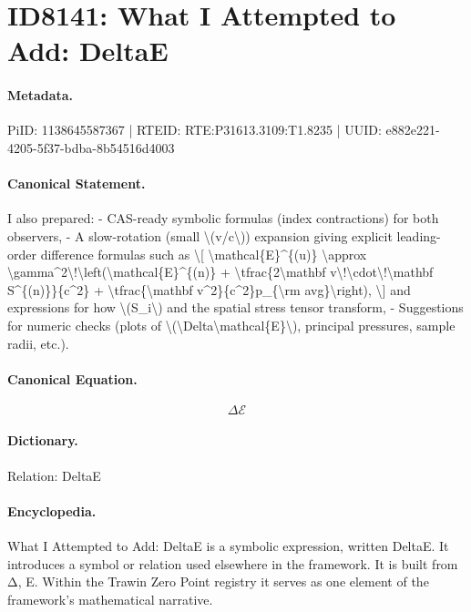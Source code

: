 \section*{ID8141: What I Attempted to Add: DeltaE}
\paragraph{Metadata.}
PiID: 1138645587367 | RTEID: RTE:P31613.3109:T1.8235 | UUID: e882e221-4205-5f37-bdba-8b54516d4003

\paragraph{Canonical Statement.}
I also prepared: - CAS-ready symbolic formulas (index contractions) for both observers, - A slow-rotation (small \textbackslash{}(v/c\textbackslash{})) expansion giving explicit leading-order difference formulas such as \textbackslash{}[ \textbackslash{}mathcal\{E\}\textasciicircum{}\{(u)\} \textbackslash{}approx \textbackslash{}gamma\textasciicircum{}2\textbackslash{}!\textbackslash{}left(\textbackslash{}mathcal\{E\}\textasciicircum{}\{(n)\} + \textbackslash{}tfrac\{2\textbackslash{}mathbf v\textbackslash{}!\textbackslash{}cdot\textbackslash{}!\textbackslash{}mathbf S\textasciicircum{}\{(n)\}\}\{c\textasciicircum{}2\} + \textbackslash{}tfrac\{\textbackslash{}mathbf v\textasciicircum{}2\}\{c\textasciicircum{}2\}p\_\{\textbackslash{}rm avg\}\textbackslash{}right), \textbackslash{}] and expressions for how \textbackslash{}(S\_i\textbackslash{}) and the spatial stress tensor transform, - Suggestions for numeric checks (plots of \textbackslash{}(\textbackslash{}Delta\textbackslash{}mathcal\{E\}\textbackslash{}), principal pressures, sample radii, etc.).

\paragraph{Canonical Equation.}
\[
\Delta\mathcal{E}
\]

\paragraph{Dictionary.}
Relation: DeltaE

\paragraph{Encyclopedia.}
What I Attempted to Add: DeltaE is a symbolic expression, written DeltaE. It introduces a symbol or relation used elsewhere in the framework. It is built from Δ, E. Within the Trawin Zero Point registry it serves as one element of the framework's mathematical narrative.

